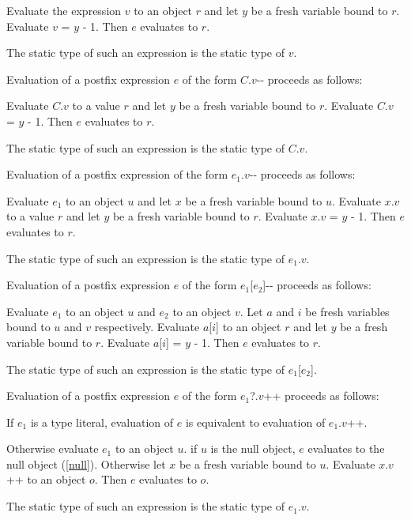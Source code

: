 \documentclass{article}
\newcommand{\code}[1]{{\sf #1}}
\begin{document}
\LMHash{}
Evaluate the expression $v$ to an object $r$
and let $y$ be a fresh variable bound to $r$.
Evaluate \code{$v$ = $y$ - 1}.
Then $e$ evaluates to $r$.

\LMHash{}
The static type of such an expression is the static type of $v$.


\LMHash{}
Evaluation of a postfix expression $e$ of the form \code{$C$.$v$-{}-}
proceeds as follows:

\LMHash{}
Evaluate \code{$C$.$v$} to a value $r$
and let $y$ be a fresh variable bound to $r$.
Evaluate \code{$C$.$v$ = $y$ - 1}.
Then $e$ evaluates to $r$.

\LMHash{}
The static type of such an expression is the static type of \code{$C$.$v$}.


\LMHash{}
Evaluation of a postfix expression of the form \code{$e_1$.$v$-{}-}
proceeds as follows:

\LMHash{}
Evaluate $e_1$ to an object $u$ and let $x$ be a fresh variable bound to $u$.
Evaluate \code{$x$.$v$} to a value $r$
and let $y$ be a fresh variable bound to $r$.
Evaluate \code{$x$.$v$ = $y$ - 1}.
Then $e$ evaluates to $r$.


\LMHash{}
The static type of such an expression is the static type of \code{$e_1$.$v$}.


\LMHash{}
Evaluation of a postfix expression $e$ of the form \code{$e_1$[$e_2$]-{}-}
proceeds as follows:

\LMHash{}
Evaluate $e_1$ to an object $u$ and $e_2$ to an object $v$.
Let $a$ and $i$ be fresh variables bound to $u$ and $v$ respectively.
Evaluate \code{$a$[$i$]} to an object $r$
and let $y$ be a fresh variable bound to $r$.
Evaluate \code{$a$[$i$] = $y$ - 1}.
Then $e$ evaluates to $r$.

\LMHash{}
The static type of such an expression is the static type of \code{$e_1$[$e_2$]}.

\LMHash{}
Evaluation of a postfix expression $e$ of the form \code{$e_1$?.$v$++}
proceeds as follows:

\LMHash{}
If $e_1$ is a type literal, evaluation of $e$ is equivalent to
evaluation of \code{$e_1$.$v$++}.

\LMHash{}
Otherwise evaluate $e_1$ to an object $u$.
if $u$ is the null object, $e$ evaluates to the null object (\ref{null}).
Otherwise let $x$ be a fresh variable bound to $u$.
Evaluate \code{$x$.$v$++} to an object $o$.
Then $e$ evaluates to $o$.

\LMHash{}
The static type of such an expression is the static type of \code{$e_1$.$v$}.
\end{document}
